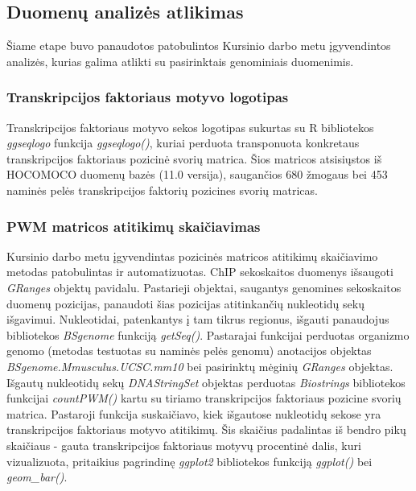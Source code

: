 \documentclass[12pt]{article}
\begin{document}
\newpage

\subsection{Duomenų analizės atlikimas}
Šiame etape buvo panaudotos patobulintos Kursinio darbo metu įgyvendintos
analizės, kurias galima atlikti su pasirinktais genominiais duomenimis.

\subsubsection*{Transkripcijos faktoriaus motyvo logotipas}
Transkripcijos faktoriaus motyvo sekos logotipas sukurtas su R bibliotekos
\emph{ggseqlogo}\cite{GGSEQLOGO} funkcija \emph{ggseqlogo()}, kuriai perduota
transponuota konkretaus transkripcijos faktoriaus pozicinė svorių matrica.
Šios matricos atsisiųstos iš HOCOMOCO\cite{HOCOMOCO} duomenų bazės (11.0
versija), saugančios 680 žmogaus bei 453 naminės pelės transkripcijos faktorių
pozicines svorių matricas.

\subsubsection*{PWM matricos atitikimų skaičiavimas}
Kursinio darbo metu įgyvendintas pozicinės matricos atitikimų skaičiavimo
metodas patobulintas ir automatizuotas. ChIP sekoskaitos duomenys išsaugoti
\emph{GRanges} objektų pavidalu. Pastarieji objektai, saugantys genomines
sekoskaitos duomenų pozicijas, panaudoti šias pozicijas atitinkančių nukleotidų
sekų išgavimui. Nukleotidai, patenkantys į tam tikrus regionus, išgauti
panaudojus bibliotekos \emph{BSgenome}\cite{BSGENOME} funkciją \emph{getSeq()}.
Pastarajai funkcijai perduotas organizmo genomo (metodas testuotas su naminės
pelės genomu) anotacijos objektas
\emph{BSgenome.Mmusculus.UCSC.mm10}\cite{BSMUSMUSCULUS} bei pasirinktų mėginių
\emph{GRanges} objektas. Išgautų nukleotidų sekų \emph{DNAStringSet} objektas
perduotas \emph{Biostrings}\cite{BIOSTRINGS} bibliotekos funkcijai
\emph{countPWM()} kartu su tiriamo transkripcijos faktoriaus pozicine svorių
matrica. Pastaroji funkcija suskaičiavo, kiek išgautose nukleotidų sekose yra
transkripcijos faktoriaus motyvo atitikimų. Šis skaičius padalintas iš bendro
pikų skaičiaus - gauta transkripcijos faktoriaus motyvų procentinė dalis,
kuri vizualizuota, pritaikius pagrindinę \emph{ggplot2} bibliotekos funkciją
\emph{ggplot()} bei \emph{geom\_bar()}.
\end{document}
